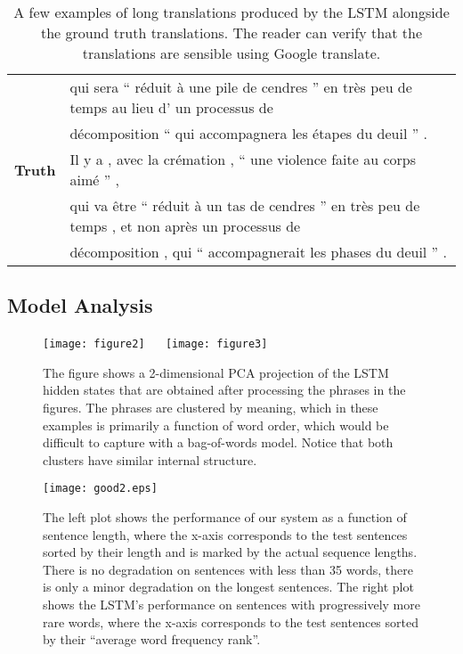\documentclass{article} \usepackage{nips14submit_e}
\begin{document}
\begin{table}[ht!]
\begin{footnotesize}
\begin{tabular}{|l|l|}
& qui sera `` r\'{e}duit \`{a} une pile de cendres '' en tr\`{e}s peu de temps au lieu d' un processus de \\
& d\'{e}composition ``  qui accompagnera les \'{e}tapes du deuil '' .\\
\hline
{\bf Truth} & 
Il y a , avec la cr\'{e}mation , `` une violence faite au corps aim\'{e} '' , \\
& qui va \^{e}tre `` r\'{e}duit \`{a} un tas de cendres '' en tr\`{e}s peu de temps , et non apr\`{e}s un processus de \\
&d\'{e}composition , qui `` accompagnerait les phases du deuil '' .\\
\hline
\end{tabular}
\end{footnotesize}
\caption{A few examples of long translations produced by the LSTM
  alongside the ground truth translations.  The reader can verify that
  the translations are sensible using Google translate.  }
\label{tab:examples}
\end{table}






\subsection{Model Analysis}

\begin{figure}[h!]
\centering
\texttt{[image: figure2]} ~~
\texttt{[image: figure3]} 
\caption{\small The figure shows a 2-dimensional PCA projection of the
  LSTM hidden states that are obtained after processing the phrases in
  the figures.  The phrases are clustered by meaning, which in these
  examples is primarily a function of word order, which would be
  difficult to capture with a bag-of-words model. Notice that both
  clusters have similar internal structure.}
\label{fig:embedding}
\end{figure}

\begin{figure}[h!]
\centerline{
\texttt{[image: good2.eps]} }  
\caption{\small The left plot shows the performance of our system as a
  function of sentence length, where the x-axis corresponds to the
  test sentences sorted by their length and is marked by the actual
  sequence lengths.  There is no degradation on sentences with less
  than 35 words, there is only a minor degradation on the longest
  sentences.  The right plot shows the LSTM's performance on sentences
  with progressively more rare words, where the x-axis corresponds to
  the test sentences sorted by their ``average word frequency rank''.
}
\label{fig:oriol}
\end{figure}
\end{document}
